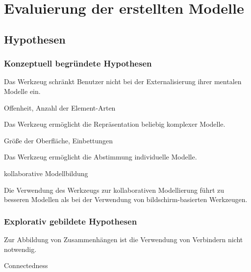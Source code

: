 \chapter{Evaluierung der erstellten Modelle} %
\label{cha:eval_modell}

\section{Hypothesen} %
\label{sec:m_hypothesen}

\subsection{Konzeptuell begründete Hypothesen} %
\label{sub:m_konzeptionell_begründete_hypothesen}

\begin{hyp}
	Das Werkzeug schränkt Benutzer nicht bei der Externalisierung ihrer mentalen Modelle ein.
\end{hyp}
Offenheit, Anzahl der Element-Arten
	
\begin{hyp}
	Das Werkzeug ermöglicht die Repräsentation beliebig komplexer Modelle.
\end{hyp}
Größe der Oberfläche, Einbettungen

\begin{hyp}
	Das Werkzeug ermöglicht die Abstimmung individuelle Modelle.
\end{hyp}
kollaborative Modellbildung

\begin{hyp}
	Die Verwendung des Werkzeugs zur kollaborativen Modellierung führt zu besseren Modellen als bei der Verwendung von bildschirm-basierten Werkzeugen.
\end{hyp}


\subsection{Explorativ gebildete Hypothesen} %
\label{sub:m_explorativ_gebildete_hypothesen}

\begin{hyp}
	\label{hyp:keineverbinder}
	Zur Abbildung von Zusammenhängen ist die Verwendung von Verbindern nicht notwendig.
\end{hyp}
Connectedness


